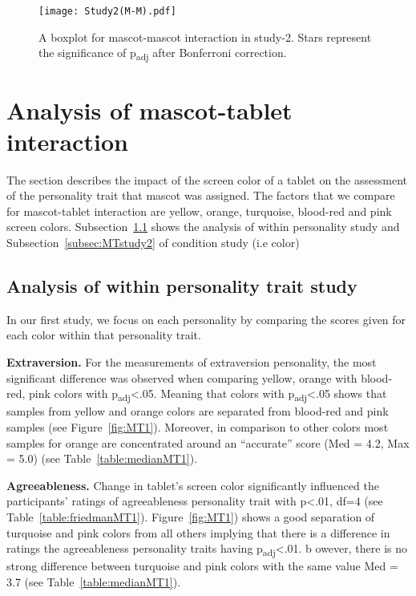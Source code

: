 \begin{figure}[!htb]
    \centering
    \texttt{[image: Study2(M-M).pdf]}
    \caption[]{A boxplot for mascot-mascot interaction in study-2.
    Stars represent the significance of p\textsubscript{adj} after Bonferroni correction.\footnotemark}
    \label{fig:MM2}
\end{figure}
\section{Analysis of mascot-tablet interaction}
\label{sec:m-t}
The section describes the impact of the screen color of a tablet on the assessment of the personality trait that
mascot was assigned.
The factors that we compare for mascot-tablet interaction are yellow,
orange, turquoise, blood-red and pink screen colors.
Subsection~\ref{subsec:MTstudy1} shows the analysis of within personality study and Subsection~\ref{subsec:MTstudy2} of condition study (i.e color)

\subsection{Analysis of within personality trait study}
\label{subsec:MTstudy1}
In our first study, we focus on each personality by comparing the scores given
for each color within that personality trait.

\par\textbf{Extraversion.}
For the measurements of extraversion personality,
the most significant difference was observed when comparing yellow, orange with
blood-red, pink colors with p\textsubscript{adj}<.05.
Meaning that colors with p\textsubscript{adj}<.05 shows that samples from yellow and orange colors are separated
from blood-red and pink samples (see Figure~\ref{fig:MT1}).
Moreover, in comparison to other colors most samples for orange are concentrated around
an “accurate” score (Med = 4.2, Max = 5.0) (see Table~\ref{table:medianMT1}).

\par\textbf{Agreeableness.}
Change in tablet's screen color significantly influenced the participants' ratings of
agreeableness personality trait with p<.01, df=4 (see Table~\ref{table:friedmanMT1}).
Figure~\ref{fig:MT1}) shows a good separation of turquoise and pink colors
from all others implying that there is a difference in ratings the
agreeableness personality traits having p\textsubscript{adj}<.01.
b owever, there is no strong difference between turquoise and pink colors with
the same value Med = 3.7 (see Table~\ref{table:medianMT1}).

